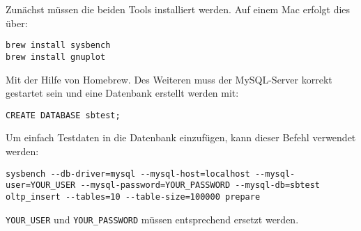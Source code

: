 Zunächst müssen die beiden Tools installiert werden.
Auf einem Mac erfolgt dies über:

\begin{lstlisting}[label={lst:install tools}]
brew install sysbench
brew install gnuplot
\end{lstlisting}

Mit der Hilfe von Homebrew.
Des Weiteren muss der MySQL-Server korrekt gestartet sein und eine Datenbank erstellt werden mit:

\begin{lstlisting}[label={lst:create databse}]
CREATE DATABASE sbtest;
\end{lstlisting}

Um einfach Testdaten in die Datenbank einzufügen, kann dieser Befehl verwendet werden:

\begin{lstlisting}[style=custom_daniel,label={lst:sysbenchrun}]
sysbench --db-driver=mysql --mysql-host=localhost --mysql-user=YOUR_USER --mysql-password=YOUR_PASSWORD --mysql-db=sbtest oltp_insert --tables=10 --table-size=100000 prepare
\end{lstlisting}

\texttt{YOUR\_USER} und \texttt{YOUR\_PASSWORD} müssen entsprechend ersetzt werden.






